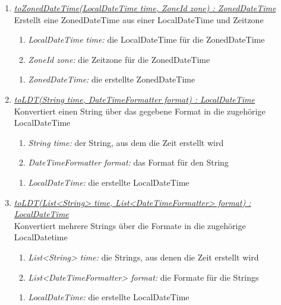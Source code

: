 \begin{enumerate}[+]
\item \underline{\textit{toZonedDateTime(LocalDateTime time, ZoneId zone) : ZonedDateTime}}\\
Erstellt eine ZonedDateTime aus einer LocalDateTime und Zeitzone

\begin{enumerate}[$\bullet$]
\item \textit{LocalDateTime time:} die LocalDateTime für die ZonedDateTime
\item \textit{ZoneId zone:} die Zeitzone für die ZonedDateTime
\end{enumerate}
\vspace{-0.2cm}
\begin{enumerate}[$\circ$]
\item \textit{ZonedDateTime:} die erstellte ZonedDateTime
\end{enumerate}

\item \underline{\textit{toLDT(String time, DateTimeFormatter format) : LocalDateTime}}\\
Konvertiert einen String über das gegebene Format in die zugehörige LocalDateTime

\begin{enumerate}[$\bullet$]
\item \textit{String time:} der String, aus dem die Zeit erstellt wird
\item \textit{DateTimeFormatter format:} das Format für den String
\end{enumerate}
\vspace{-0.2cm}
\begin{enumerate}[$\circ$]
\item \textit{LocalDateTime:} die erstellte LocalDateTime
\end{enumerate}

\item \underline{\textit{toLDT(List<String> time, List<DateTimeFormatter> format) : LocalDateTime}}\\
Konvertiert mehrere Strings über die Formate in die zugehörige LocalDatetime

\begin{enumerate}[$\bullet$]
\item \textit{List<String> time:} die Strings, aus denen die Zeit erstellt wird
\item \textit{List<DateTimeFormatter> format:} die Formate für die Strings
\end{enumerate}
\vspace{-0.2cm}
\begin{enumerate}[$\circ$]
\item \textit{LocalDateTime:} die erstellte LocalDateTime
\end{enumerate}


\end{enumerate}
